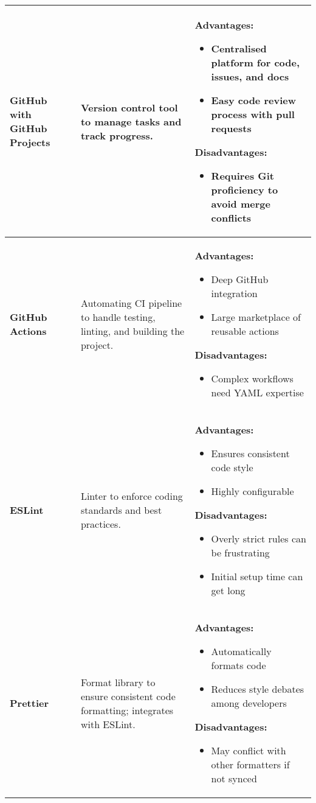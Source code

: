 \documentclass{article}
\begin{document}
\begin{table}[htbp]
\begin{tabularx}{\textwidth}{p{2cm} p{4cm} X}
  \textbf{GitHub with GitHub Projects} 
  & Version control tool to manage tasks and track progress.
  & \textbf{Advantages:}
    \begin{itemize}
      \item Centralised platform for code, issues, and docs
      \item Easy code review process with pull requests
    \end{itemize}
    \textbf{Disadvantages:}
    \begin{itemize}
      \item Requires Git proficiency to avoid merge conflicts
    \end{itemize}
  \\
  \midrule


  \textbf{GitHub Actions} 
  & Automating CI pipeline to handle testing, linting, and building the project.
  & \textbf{Advantages:}
    \begin{itemize}
      \item Deep GitHub integration
      \item Large marketplace of reusable actions
    \end{itemize}
    \textbf{Disadvantages:}
    \begin{itemize}
      \item Complex workflows need YAML expertise
    \end{itemize}
  \\
  \midrule

  \textbf{ESLint} 
  & Linter to enforce coding standards and best practices.
  & \textbf{Advantages:}
    \begin{itemize}
      \item Ensures consistent code style
      \item Highly configurable
    \end{itemize}
    \textbf{Disadvantages:}
    \begin{itemize}
      \item Overly strict rules can be frustrating
      \item Initial setup time can get long 
    \end{itemize}
  \\
  \midrule

  \textbf{Prettier} 
  & Format library to ensure consistent code formatting; integrates with ESLint.
  & \textbf{Advantages:}
    \begin{itemize}
      \item Automatically formats code
      \item Reduces style debates among developers
    \end{itemize}
    \textbf{Disadvantages:}
    \begin{itemize}
      \item May conflict with other formatters if not synced
    \end{itemize}
  \\
  \midrule


\end{tabularx}
\end{table}
\end{document}
